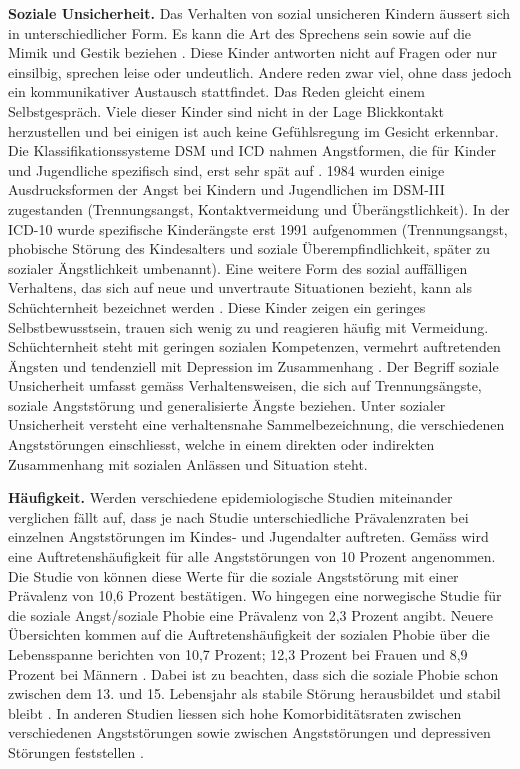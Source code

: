 \textbf{Soziale Unsicherheit.}
Das Verhalten von sozial unsicheren Kindern äussert sich in unterschiedlicher Form. Es kann die Art des Sprechens sein sowie auf die Mimik und Gestik beziehen \cite{Petermann:2015}. Diese Kinder antworten nicht auf Fragen oder nur einsilbig, sprechen leise oder undeutlich. Andere reden zwar viel, ohne dass jedoch ein kommunikativer Austausch stattfindet. Das Reden gleicht einem Selbstgespräch. Viele dieser Kinder sind nicht in der Lage Blickkontakt herzustellen und bei einigen ist auch keine Gefühlsregung im Gesicht erkennbar. Die Klassifikationssysteme DSM und ICD nahmen Angstformen, die für Kinder und Jugendliche spezifisch sind, erst sehr spät auf \cite{Petermann:2015}. 1984 wurden einige Ausdrucksformen der Angst bei Kindern und Jugendlichen im DSM-III zugestanden (Trennungsangst, Kontaktvermeidung und Überängstlichkeit). In der ICD-10 wurde spezifische Kinderängste erst 1991 aufgenommen (Trennungsangst, phobische Störung des Kindesalters und soziale Überempfindlichkeit, später zu sozialer Ängstlichkeit umbenannt). Eine weitere Form des sozial auffälligen Verhaltens, das sich auf neue und unvertraute Situationen bezieht, kann als Schüchternheit bezeichnet werden \cite{Petermann:2015b}. Diese Kinder zeigen ein geringes Selbstbewusstsein, trauen sich wenig zu und reagieren häufig mit Vermeidung. Schüchternheit steht mit geringen sozialen Kompetenzen, vermehrt auftretenden Ängsten und tendenziell mit Depression im Zusammenhang \cite{Karevold:2012}. Der Begriff soziale Unsicherheit umfasst gemäss  Verhaltensweisen, die sich auf Trennungsängste, soziale Angststörung und generalisierte Ängste beziehen. Unter sozialer Unsicherheit versteht  eine verhaltensnahe Sammelbezeichnung, die verschiedenen Angststörungen einschliesst, welche in einem direkten oder indirekten Zusammenhang mit sozialen Anlässen und Situation steht. 

\textbf{Häufigkeit.} Werden verschiedene epidemiologische Studien miteinander verglichen fällt auf, dass je nach Studie unterschiedliche Prävalenzraten bei einzelnen Angststörungen im Kindes- und Jugendalter auftreten. Gemäss  wird eine Auftretenshäufigkeit für alle Angststörungen von 10 Prozent angenommen. Die Studie von  können diese Werte für die soziale Angststörung mit einer Prävalenz von 10,6 Prozent bestätigen. Wo hingegen eine norwegische Studie \cite{VanRoy:2009} für die soziale Angst/soziale Phobie eine Prävalenz von 2,3 Prozent angibt. Neuere Übersichten kommen auf die Auftretenshäufigkeit der sozialen Phobie über die Lebensspanne berichten von 10,7 Prozent; 12,3 Prozent bei Frauen und 8,9 Prozent bei Männern \cite{Kessler:2012}. Dabei ist zu beachten, dass sich die soziale Phobie schon zwischen dem 13. und 15. Lebensjahr als stabile Störung herausbildet und stabil bleibt \cite{Petermann:2015}. 
In anderen Studien liessen sich hohe Komorbiditätsraten zwischen verschiedenen Angststörungen \cite{HelbigLang:2009} sowie zwischen Angststörungen und depressiven Störungen feststellen \cite{Beesdo:2007}. 

